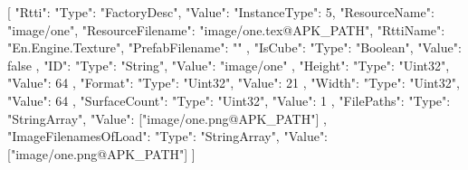 [{
        "Rtti": {
            "Type": "FactoryDesc",
            "Value": {
                "InstanceType": 5,
                "ResourceName": "image/one",
                "ResourceFilename": "image/one.tex@APK_PATH",
                "RttiName": "En.Engine.Texture",
                "PrefabFilename": ""
            }
        },
        "IsCube": {
            "Type": "Boolean",
            "Value": false
        },
        "ID": {
            "Type": "String",
            "Value": "image/one"
        },
        "Height": {
            "Type": "Uint32",
            "Value": 64
        },
        "Format": {
            "Type": "Uint32",
            "Value": 21
        },
        "Width": {
            "Type": "Uint32",
            "Value": 64
        },
        "SurfaceCount": {
            "Type": "Uint32",
            "Value": 1
        },
        "FilePaths": {
            "Type": "StringArray",
            "Value": ["image/one.png@APK_PATH"]
        },
        "ImageFilenamesOfLoad": {
            "Type": "StringArray",
            "Value": ["image/one.png@APK_PATH"]
        }
    }]